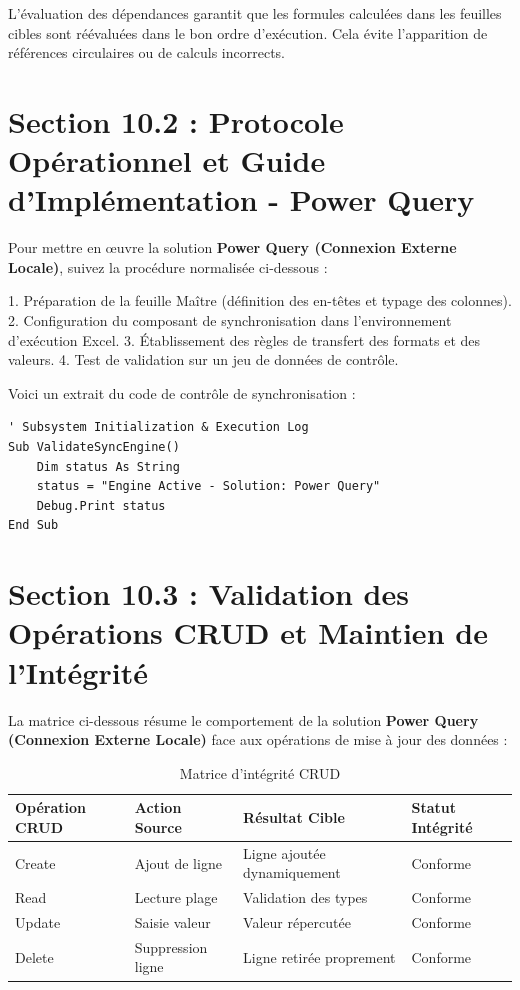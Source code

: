 \documentclass[12pt,a4paper]{report}
\begin{document}
L'évaluation des dépendances garantit que les formules calculées dans les feuilles cibles sont réévaluées dans le bon ordre d'exécution. Cela évite l'apparition de références circulaires ou de calculs incorrects.


\section{Section 10.2 : Protocole Opérationnel et Guide d'Implémentation - Power Query}
Pour mettre en œuvre la solution \textbf{Power Query (Connexion Externe Locale)}, suivez la procédure normalisée ci-dessous :

1. Préparation de la feuille Maître (définition des en-têtes et typage des colonnes).
2. Configuration du composant de synchronisation dans l'environnement d'exécution Excel.
3. Établissement des règles de transfert des formats et des valeurs.
4. Test de validation sur un jeu de données de contrôle.

Voici un extrait du code de contrôle de synchronisation :
\begin{lstlisting}[caption=Code de controle operationnel]
' Subsystem Initialization & Execution Log
Sub ValidateSyncEngine()
    Dim status As String
    status = "Engine Active - Solution: Power Query"
    Debug.Print status
End Sub
\end{lstlisting}


\section{Section 10.3 : Validation des Opérations CRUD et Maintien de l'Intégrité}
La matrice ci-dessous résume le comportement de la solution \textbf{Power Query (Connexion Externe Locale)} face aux opérations de mise à jour des données :

\begin{table}[h]
\centering
\begin{tabular}{@{}llll@{}}
\toprule
\textbf{Opération CRUD} & \textbf{Action Source} & \textbf{Résultat Cible} & \textbf{Statut Intégrité} \\ \midrule
Create & Ajout de ligne & Ligne ajoutée dynamiquement & Conforme \\
Read & Lecture plage & Validation des types & Conforme \\
Update & Saisie valeur & Valeur répercutée & Conforme \\
Delete & Suppression ligne & Ligne retirée proprement & Conforme \\ \bottomrule
\end{tabular}
\caption{Matrice d'intégrité CRUD}
\end{table}
\end{document}
